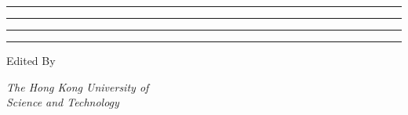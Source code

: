 \documentclass[../template.tex]{subfiles}
\begin{document}
 
\makeatletter
\begin{titlepage} %
	
	\centering %
	
	\scshape %
	
	\vspace*{\baselineskip} %
	
	
	\rule{\textwidth}{1.6pt}\vspace*{-\baselineskip}\vspace*{2pt} %
	\rule{\textwidth}{0.4pt} %
	
	\vspace{1.75\baselineskip} %
	
	{\LARGE \@title} %
	
	\vspace{0.75\baselineskip} %
	
	\rule{\textwidth}{0.4pt}\vspace*{-\baselineskip}\vspace{3.2pt} %
	\rule{\textwidth}{1.6pt} %
	
	\vspace{2\baselineskip} %
	
	
	
	\vspace*{3\baselineskip} %
	
	
	Edited By
	
	\vspace{0.5\baselineskip} %
	
	{\scshape\Large \@author} %
	
	\vspace{0.5\baselineskip} %
	
	\textit{The Hong Kong University of\\Science and Technology} %
	
	\vfill %
	
	
	\vspace{0.3\baselineskip} %
	
	\@date
\end{titlepage}
\makeatother
\end{document}
